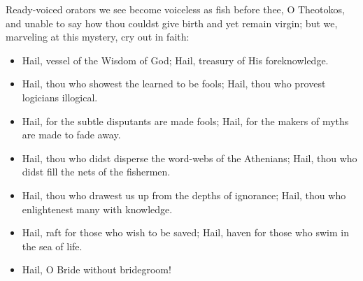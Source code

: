 \documentclass[twoside, letterpaper, 12pt]{report}
\begin{document}

\begin{priest}
  \item Ready-voiced orators we see become voiceless as fish before thee, O Theotokos, and
  unable to say how thou couldst give birth and yet remain virgin; but we, marveling at
  this mystery, cry out in faith:
\end{priest}

\begin{itemize}[label=\tiny{+},leftmargin=*]
\item Hail, vessel of the Wisdom of God;
      Hail, treasury of His foreknowledge.
\item Hail, thou who showest the learned to be fools;
      Hail, thou who provest logicians illogical.
\item Hail, for the subtle disputants are made fools;
      Hail, for the makers of myths are made to fade away.
\item Hail, thou who didst disperse the word-webs of the Athenians;
      Hail, thou who didst fill the nets of the fishermen.
\item Hail, thou who drawest us up from the depths of ignorance;
      Hail, thou who enlightenest many with knowledge.
\item Hail, raft for those who wish to be saved;
      Hail, haven for those who swim in the sea of life.
\item Hail, O Bride without bridegroom! 
\end{itemize}







\end{document}
